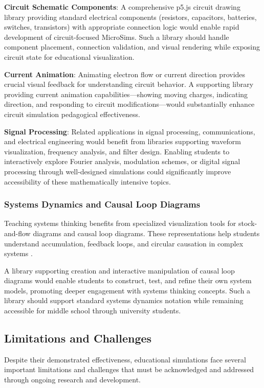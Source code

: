 \textbf{Circuit Schematic Components}: A comprehensive p5.js circuit drawing library providing standard electrical components (resistors, capacitors, batteries, switches, transistors) with appropriate connection logic would enable rapid development of circuit-focused MicroSims. Such a library should handle component placement, connection validation, and visual rendering while exposing circuit state for educational visualization.

\textbf{Current Animation}: Animating electron flow or current direction provides crucial visual feedback for understanding circuit behavior. A supporting library providing current animation capabilities—showing moving charges, indicating direction, and responding to circuit modifications—would substantially enhance circuit simulation pedagogical effectiveness.

\textbf{Signal Processing}: Related applications in signal processing, communications, and electrical engineering would benefit from libraries supporting waveform visualization, frequency analysis, and filter design. Enabling students to interactively explore Fourier analysis, modulation schemes, or digital signal processing through well-designed simulations could significantly improve accessibility of these mathematically intensive topics.

\subsubsection{Systems Dynamics and Causal Loop Diagrams}

Teaching systems thinking benefits from specialized visualization tools for stock-and-flow diagrams and causal loop diagrams. These representations help students understand accumulation, feedback loops, and circular causation in complex systems \cite{eric2009}.

A library supporting creation and interactive manipulation of causal loop diagrams would enable students to construct, test, and refine their own system models, promoting deeper engagement with systems thinking concepts. Such a library should support standard systems dynamics notation while remaining accessible for middle school through university students.

\subsection{Limitations and Challenges}

Despite their demonstrated effectiveness, educational simulations face several important limitations and challenges that must be acknowledged and addressed through ongoing research and development.

